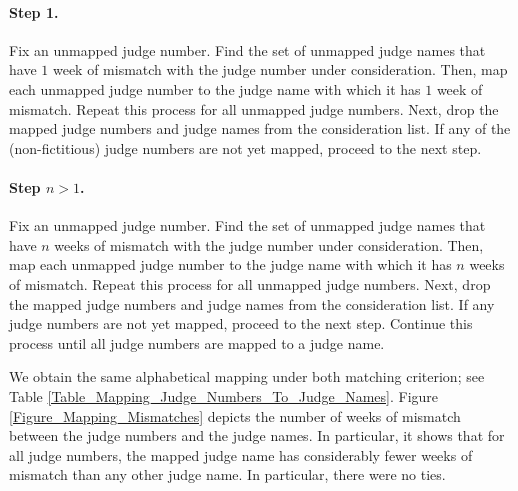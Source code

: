 \documentclass[11pt, oneside]{article}   	%
\theoremstyle{ModifiedStyle}
\begin{document}
  	\paragraph{Step 1.} Fix an unmapped judge number. Find the set of unmapped judge names that have $1$ week of mismatch with the judge number under consideration. Then, map each unmapped judge number to the judge name with which it has $1$ week of mismatch. Repeat this process for all unmapped judge numbers. Next, drop the mapped judge numbers and judge names from the consideration list. If any of the (non-fictitious) judge numbers are not yet mapped, proceed to the next step.
  	\vspace{-5mm}
  	\paragraph{Step $n>1$.} Fix an unmapped judge number. Find the set of unmapped judge names that have $n$ weeks of mismatch with the judge number under consideration. Then, map each unmapped judge number to the judge name with which it has $n$ weeks of mismatch. Repeat this process for all unmapped judge numbers. Next, drop the mapped judge numbers and judge names from the consideration list. If any judge numbers are not yet mapped, proceed to the next step. Continue this process until all judge numbers are mapped to a judge name.

  	We obtain the same alphabetical mapping under both matching criterion; see Table \ref{Table_Mapping_Judge_Numbers_To_Judge_Names}. Figure \ref{Figure_Mapping_Mismatches} depicts the number of weeks of mismatch between the judge numbers and the judge names. In particular, it shows that for all judge numbers, the mapped judge name has considerably fewer weeks of mismatch than any other judge name. In particular, there were no ties.
\end{document}
